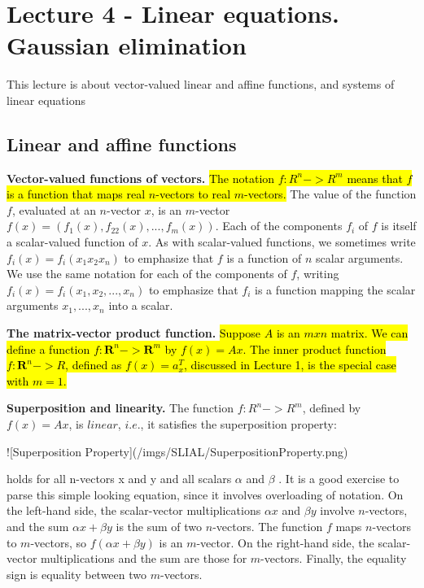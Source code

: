 \documentclass[11pt,oneside,a4paper,openright]{article}
\begin{document}
\section*{Lecture 4 - Linear equations. Gaussian elimination}

This lecture is about vector-valued linear and affine functions, and systems of linear equations

\subsection*{Linear and affine functions}

\textbf{Vector-valued functions of vectors.} \hl{The notation $f : R^n -> R^m$ means that $f$ is a function that maps real $n$-vectors to real $m$-vectors.} The value of the function $f$, evaluated at an $n$-vector $x$, is an $m$-vector $f(x) = (f_1(x), f_22(x),..., f_m(x))$. Each of the components $f_i$ of $f$ is itself a scalar-valued function of $x$. As with scalar-valued functions, we sometimes write $f_i(x) = f_i(x_1 x_2 x_n)$ to emphasize that $f$ is a function of $n$ scalar arguments. We use the same notation for each of the components of $f$, writing $f_i(x) = f_i(x_1, x_2, ..., x_n)$ to emphasize that $f_i$ is a function mapping the scalar arguments $x_1, ..., x_n$ into a scalar.

\textbf{The matrix-vector product function.} \hl{Suppose $A$ is an $m x n$ matrix. We can define a function $f : \textbf{R}^n -> \textbf{R}^m$ by $f(x) = Ax$. The inner product function $f : \textbf{R}^n -> R$, defined as $f(x) = a^T_x$, discussed in Lecture 1, is the special case with $m=1$.}

\textbf{Superposition and linearity.} The function $f: R^n -> R^m$, defined by $f(x) = Ax$, is $linear$, $i.e.$, it satisfies the superposition property:

![Superposition Property](/imgs/SLIAL/SuperpositionProperty.png)

holds for all n-vectors x and y and all scalars $\alpha$ and $\beta$ . It is a good exercise to parse this simple looking equation, since it involves overloading of notation. On the left-hand side, the scalar-vector multiplications $\alpha x$ and $\beta y$ involve $n$-vectors, and the sum $\alpha x+\beta y$ is the sum of two $n$-vectors. The function $f$ maps $n$-vectors to $m$-vectors, so $f(\alpha x+\beta y)$ is an $m$-vector. On the right-hand side, the scalar-vector multiplications and the sum are those for $m$-vectors. Finally, the equality sign is equality between two $m$-vectors.
\end{document}
